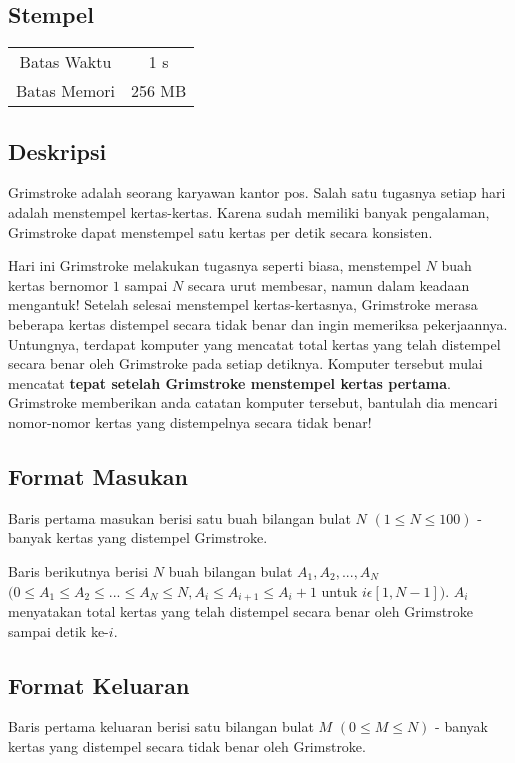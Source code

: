 \documentclass{article}
\begin{document}
\begin{center}
    \section*{Stempel} %

    \begin{tabular}{ | c c | }
        \hline
        Batas Waktu  & 1 s \\    %
        Batas Memori & 256 MB \\  %
        \hline
    \end{tabular}
\end{center}

\subsection*{Deskripsi}
Grimstroke adalah seorang karyawan kantor pos. Salah satu tugasnya setiap hari adalah menstempel kertas-kertas. Karena sudah memiliki banyak pengalaman, Grimstroke dapat menstempel satu kertas per detik secara konsisten.

Hari ini Grimstroke melakukan tugasnya seperti biasa, menstempel $N$ buah kertas bernomor $1$ sampai $N$ secara urut membesar, namun dalam keadaan mengantuk! Setelah selesai menstempel kertas-kertasnya, Grimstroke merasa beberapa kertas distempel secara tidak benar dan ingin memeriksa pekerjaannya. Untungnya, terdapat komputer yang mencatat total kertas yang telah distempel secara benar oleh Grimstroke pada setiap detiknya. Komputer tersebut mulai mencatat \textbf{tepat setelah Grimstroke menstempel kertas pertama}. Grimstroke memberikan anda catatan komputer tersebut, bantulah dia mencari nomor-nomor kertas yang distempelnya secara tidak benar!

\subsection*{Format Masukan}
Baris pertama masukan berisi satu buah bilangan bulat $N$ $(1 \leq N \leq 100)$ - banyak kertas yang distempel Grimstroke.

Baris berikutnya berisi $N$ buah bilangan bulat $A_1, A_2, ..., A_N$ $(0 \leq A_1 \leq A_2 \leq ... \leq A_N \leq N, A_i \leq A_{i+1} \leq A_i+1$ untuk $i \epsilon [1,N-1])$. $A_i$ menyatakan total kertas yang telah distempel secara benar oleh Grimstroke sampai detik ke-$i$.


\subsection*{Format Keluaran}
Baris pertama keluaran berisi satu bilangan bulat $M$ $(0 \leq M \leq N)$ - banyak kertas yang distempel secara tidak benar oleh Grimstroke.
\end{document}
